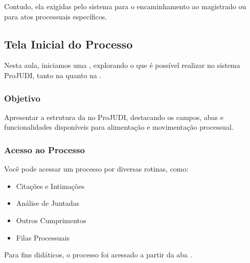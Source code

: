 \documentclass[letterpaper,10pt,brazil]{sphinxmanual}
\begin{document}
\sphinxAtStartPar
Contudo, ela  exigidas pelo sistema para o encaminhamento ao magistrado ou para atos processuais específicos.

\sphinxstepscope


\subsection{Tela Inicial do Processo}
\label{\detokenize{projud_11_telainicialprocesso:tela-inicial-do-processo}}\label{\detokenize{projud_11_telainicialprocesso::doc}}
\sphinxAtStartPar
Nesta aula, iniciamos uma , explorando o que é possível realizar  no sistema ProJUDI, tanto na  quanto na .


\subsubsection{Objetivo}
\label{\detokenize{projud_11_telainicialprocesso:objetivo}}
\sphinxAtStartPar
Apresentar a estrutura da  no ProJUDI, destacando os campos, abas e funcionalidades disponíveis para alimentação e movimentação processual.


\subsubsection{Acesso ao Processo}
\label{\detokenize{projud_11_telainicialprocesso:acesso-ao-processo}}
\sphinxAtStartPar
Você pode acessar um processo por diversas rotinas, como:
\begin{itemize}
\item {} 
\sphinxAtStartPar
Citações e Intimações

\item {} 
\sphinxAtStartPar
Análise de Juntadas

\item {} 
\sphinxAtStartPar
Outros Cumprimentos

\item {} 
\sphinxAtStartPar
Filas Processuais

\end{itemize}

\sphinxAtStartPar
Para fins didáticos, o processo foi acessado a partir da aba .
\end{document}
